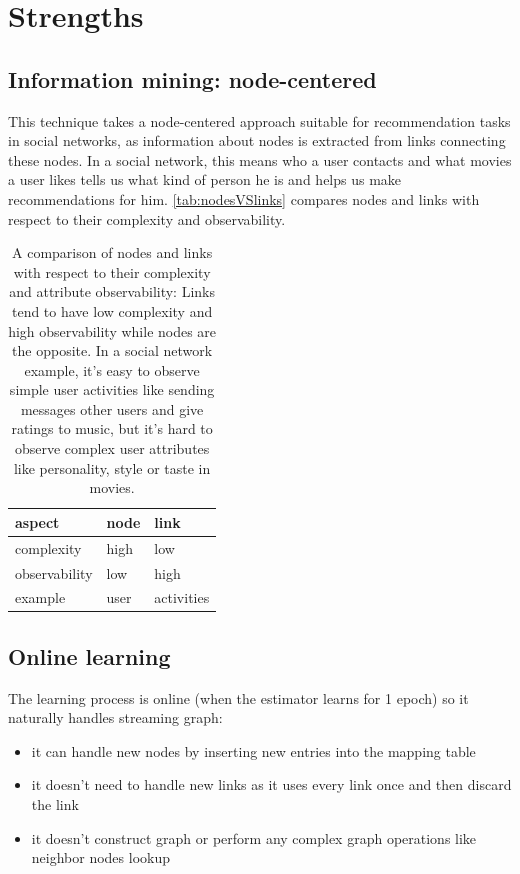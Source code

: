 \documentclass{article}
\begin{document}
\section{Strengths}

\subsection{Information mining: node-centered}
This technique takes a node-centered approach suitable for recommendation tasks 
in social networks, as information about nodes is extracted from links 
connecting these nodes.
In a social network, this means who a user contacts and what 
movies a user likes tells us what kind of person he is and helps us make 
recommendations for him. 
\autoref{tab:nodesVSlinks} compares nodes and links with respect to their 
complexity and observability.
\begin{table}[h]
	\centering
	\begin{tabularx}{0.5\textwidth}{ |X|X|X| } \hline
		aspect  & node & link \\ \hline
		complexity & high & low \\ \hline
		observability & low & high \\ \hline
		example & user & activities \\ \hline
	\end{tabularx}
	\caption{A comparison of nodes and links with respect to their complexity 
		and attribute observability:
		Links tend to have low complexity and high observability while nodes 
		are the opposite.
		In a social network example,
		it's easy to observe simple user activities like sending messages other 
		users and give ratings to music,
		but it's hard to observe complex user attributes like personality, 
		style or taste in movies.}
	\label{tab:nodesVSlinks}
\end{table}

\subsection{Online learning}
The learning process is online (when the estimator learns for 1 epoch) so it 
naturally handles streaming graph:
\begin{itemize}
	\item it can handle new nodes by inserting new entries into the mapping 
	table
	\item it doesn't need to handle new links as it uses every link once and 
	then discard the link
	\item it doesn't construct graph or perform any complex graph operations 
	like neighbor nodes lookup
\end{itemize}
\end{document}
